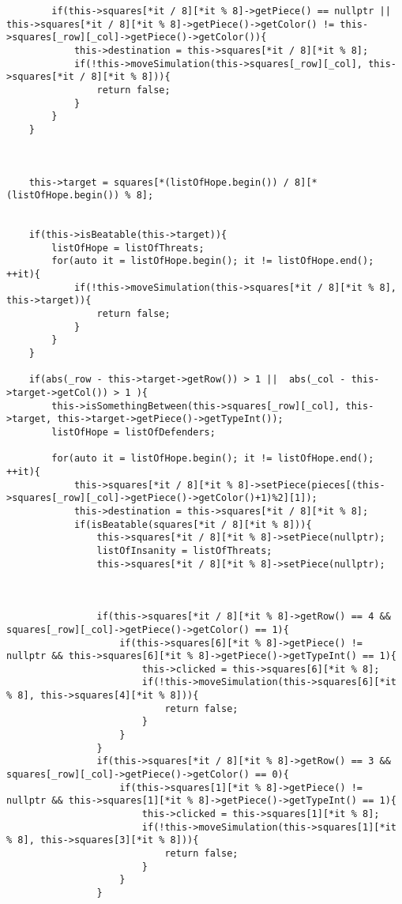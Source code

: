 \documentclass[]{report}
\begin{document}
\begin{flushleft}
\begin{lstlisting}
		if(this->squares[*it / 8][*it % 8]->getPiece() == nullptr || this->squares[*it / 8][*it % 8]->getPiece()->getColor() != this->squares[_row][_col]->getPiece()->getColor()){
			this->destination = this->squares[*it / 8][*it % 8];
			if(!this->moveSimulation(this->squares[_row][_col], this->squares[*it / 8][*it % 8])){
				return false;
			}
		}
	}
	
	
	
	this->target = squares[*(listOfHope.begin()) / 8][*(listOfHope.begin()) % 8];
	
	
	if(this->isBeatable(this->target)){
		listOfHope = listOfThreats;
		for(auto it = listOfHope.begin(); it != listOfHope.end(); ++it){
			if(!this->moveSimulation(this->squares[*it / 8][*it % 8], this->target)){
				return false;
			}
		}
	}
	
	if(abs(_row - this->target->getRow()) > 1 ||  abs(_col - this->target->getCol()) > 1 ){
		this->isSomethingBetween(this->squares[_row][_col], this->target, this->target->getPiece()->getTypeInt());
		listOfHope = listOfDefenders;
		
		for(auto it = listOfHope.begin(); it != listOfHope.end(); ++it){
			this->squares[*it / 8][*it % 8]->setPiece(pieces[(this->squares[_row][_col]->getPiece()->getColor()+1)%2][1]);
			this->destination = this->squares[*it / 8][*it % 8];
			if(isBeatable(squares[*it / 8][*it % 8])){
				this->squares[*it / 8][*it % 8]->setPiece(nullptr);
				listOfInsanity = listOfThreats;
				this->squares[*it / 8][*it % 8]->setPiece(nullptr);
				
				
				
				if(this->squares[*it / 8][*it % 8]->getRow() == 4 && squares[_row][_col]->getPiece()->getColor() == 1){
					if(this->squares[6][*it % 8]->getPiece() != nullptr && this->squares[6][*it % 8]->getPiece()->getTypeInt() == 1){
						this->clicked = this->squares[6][*it % 8];
						if(!this->moveSimulation(this->squares[6][*it % 8], this->squares[4][*it % 8])){
							return false;
						}
					}
				}
				if(this->squares[*it / 8][*it % 8]->getRow() == 3 && squares[_row][_col]->getPiece()->getColor() == 0){
					if(this->squares[1][*it % 8]->getPiece() != nullptr && this->squares[1][*it % 8]->getPiece()->getTypeInt() == 1){
						this->clicked = this->squares[1][*it % 8];
						if(!this->moveSimulation(this->squares[1][*it % 8], this->squares[3][*it % 8])){
							return false;
						}
					}
				}
				

\end{lstlisting}
\end{flushleft}
\end{document}
